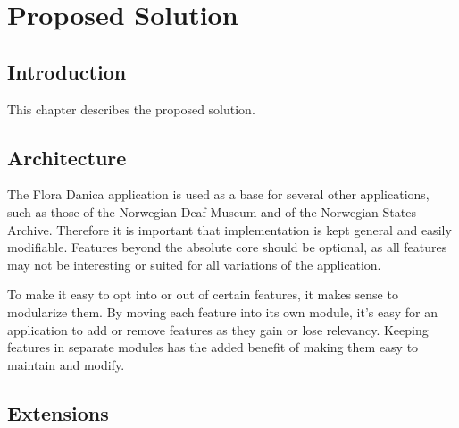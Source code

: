 
\chapter{Proposed Solution}

\label{Chapter3}



\section{Introduction}

This chapter describes the proposed solution.


\section{Architecture}

The Flora Danica application is used as a base for several other applications, such as those of the Norwegian Deaf Museum and of the Norwegian States Archive. Therefore it is important that implementation is kept general and easily modifiable. Features beyond the absolute core should be optional, as all features may not be interesting or suited for all variations of the application.

To make it easy to opt into or out of certain features, it makes sense to modularize them. By moving each feature into its own module, it's easy for an application to add or remove features as they gain or lose relevancy. Keeping features in separate modules has the added benefit of making them easy to maintain and modify.


\section{Extensions}

